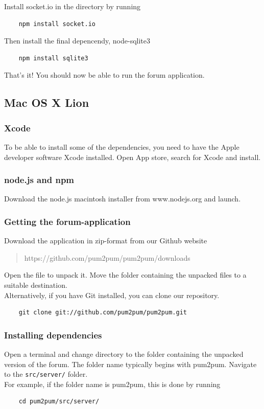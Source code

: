 \documentclass[a4paper, 12pt, titlepage]{article}
\begin{document}
	Install socket.io in the directory by running

	\begin{lstlisting}
	npm install socket.io
	\end{lstlisting}

	Then install the final depencendy, node-sqlite3

	\begin{lstlisting}
	npm install sqlite3
	\end{lstlisting}

	That's it! You should now be able to run the forum application.



	\subsection{Mac OS X Lion}
	\label{sec:osxinstall}


	\subsubsection{Xcode}
	To be able to install some of the dependencies, you need to have the Apple developer software Xcode installed. Open App store, search for Xcode and install.


	\subsubsection{node.js and npm}
	Download the node.js macintosh installer from www.nodejs.org and launch.

	\subsubsection{Getting the forum-application}
	Download the application in zip-format from our Github website
	\begin{quote}
	https://github.com/pum2pum/pum2pum/downloads
	\end{quote}
	Open the file to unpack it. Move the folder containing the unpacked files to a suitable destination.\\

	Alternatively, if you have Git installed, you can clone our repository.
	\begin{lstlisting}
	git clone git://github.com/pum2pum/pum2pum.git
	\end{lstlisting}
  

	\subsubsection{Installing dependencies}
	Open a terminal and change directory to the folder containing the unpacked version of the forum. The folder name typically begins with pum2pum. Navigate to the \lstinline{src/server/} folder.\\
	For example, if the folder name is pum2pum, this is done by running
	\begin{lstlisting}
	cd pum2pum/src/server/
	\end{lstlisting}
\end{document}
